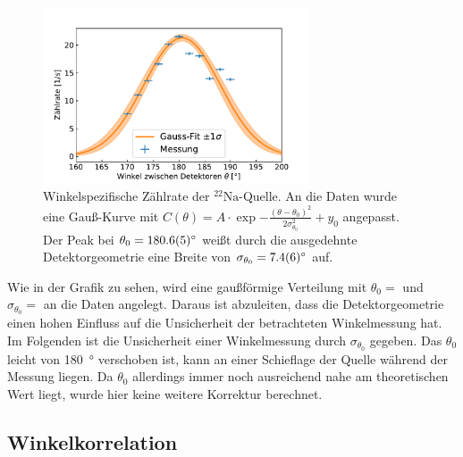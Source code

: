	\begin{figure}[ht]
		\centering
		\includegraphics[width=0.7\textwidth]{dat/vernichtung.pdf}
		\caption{Winkelspezifische Zählrate der $^{22}\text{Na}$-Quelle.
			An die Daten wurde eine Gauß-Kurve mit $C(\theta) = A \cdot \exp{-\frac{(\theta - \theta_0)^2}{2 \sigma_{\theta_0}^2}} + y_0$ angepasst.
			Der Peak bei $\theta_0 = \SI{180,6 \pm 0,5}{\degree}$ weißt durch die ausgedehnte Detektorgeometrie eine Breite von $\sigma_{\theta_0} = \SI{7,4 \pm 0,6}{\degree}$ auf.}
		\label{fig:vernichtung}
	\end{figure}

	Wie in der Grafik zu sehen, wird eine gaußförmige Verteilung mit $\theta_0 = $ und $\sigma_{\theta_0} = $ an die Daten angelegt.
	Daraus ist abzuleiten, dass die Detektorgeometrie einen hohen Einfluss auf die Unsicherheit der betrachteten Winkelmessung hat.
	Im Folgenden ist die Unsicherheit einer Winkelmessung durch $\sigma_{\theta_0}$ gegeben.
	Das $\theta_0$ leicht von \SI{180}{\degree} verschoben ist, kann an einer Schieflage der Quelle während der Messung liegen.
	Da $\theta_0$ allerdings immer noch ausreichend nahe am theoretischen Wert liegt, wurde hier keine weitere Korrektur berechnet.
	
	

\subsection{Winkelkorrelation}


